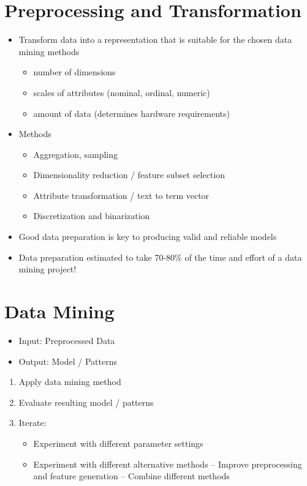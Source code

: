 \chapter{Preprocessing and Transformation}
\begin{itemize}
\item Transform data into a representation that is suitable for the chosen data mining methods
\begin{itemize}
\item number of dimensions
\item scales of attributes (nominal, ordinal, numeric)
\item amount of data (determines hardware requirements)
\end{itemize}
\item Methods
\begin{itemize}
\item Aggregation, sampling
\item Dimensionality reduction / feature subset selection
\item Attribute transformation / text to term vector
\item Discretization and binarization
\end{itemize}
\item Good data preparation is key to producing valid and reliable models
\item Data preparation estimated to take 70-80\% of the time and effort of a data mining project!
\end{itemize}

\chapter{Data Mining}
\begin{itemize}
\item Input: Preprocessed Data
\item Output: Model / Patterns
\end{itemize}

\begin{enumerate}
\item Apply data mining method
\item Evaluate resulting model / patterns
\item Iterate:
\begin{itemize}
\item Experiment with different parameter settings
\item Experiment with different alternative methods – Improve preprocessing and feature generation – Combine different methods
\end{itemize}
\end{enumerate}

